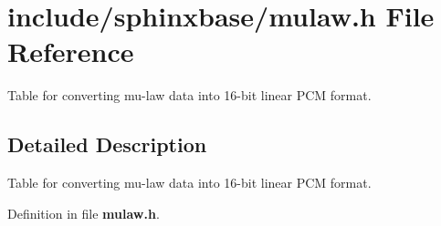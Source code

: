 \section{include/sphinxbase/mulaw.h \-File \-Reference}
\label{mulaw_8h}


\-Table for converting mu-\/law data into 16-\/bit linear \-P\-C\-M format.  




\subsection{\-Detailed \-Description}
\-Table for converting mu-\/law data into 16-\/bit linear \-P\-C\-M format. 

\-Definition in file {\bf mulaw.\-h}.

